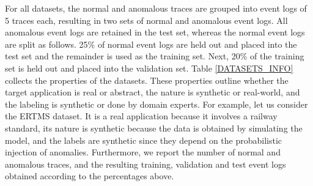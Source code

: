 For all datasets, the normal and anomalous traces are grouped into event logs of 5 traces each, resulting in two sets of normal and anomalous event logs. All anomalous event logs are retained in the test set, whereas the normal event logs are split as follows. 25\% of normal event logs are held out and placed into the test set and the remainder is used as the training set. Next, 20\% of the training set is held out and placed into the validation set. Table \ref{DATASETS_INFO} collects the properties of the datasets. These properties outline whether the target application is real or abstract, the nature is synthetic or real-world, and the labeling is synthetic or done by domain experts. For example, let us consider the ERTMS dataset. It is a real application because it involves a railway standard, its nature is synthetic because the data is obtained by simulating the model, and the labels are synthetic since they depend on the probabilistic injection of anomalies. Furthermore, we report the number of normal and anomalous traces, and the resulting training, validation and test event logs obtained according to the percentages above. 
\begin{table}[!t]
\centering
\caption{The properties of the datasets for the experiments.}
\label{DATASETS_INFO}
\end{table}
